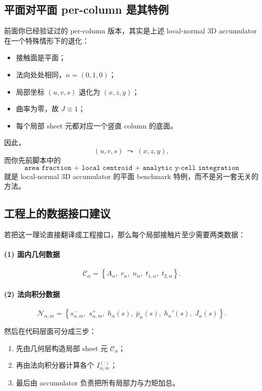 \documentclass[12pt,a4paper]{ctexart}
\begin{document}
\subsection{平面对平面 per-column 是其特例}

前面你已经验证过的 per-column 版本，其实是上述 local-normal 3D accumulator 在一个特殊情形下的退化：
\begin{itemize}
    \item 接触面是平面；
    \item 法向处处相同，$n=(0,1,0)$；
    \item 局部坐标 $(u,v,s)$ 退化为 $(x,z,y)$；
    \item 曲率为零，故 $J\equiv 1$；
    \item 每个局部 sheet 元都对应一个竖直 column 的底面。
\end{itemize}
因此，
\begin{equation}
    (u,v,s)\;\leadsto\;(x,z,y),
\end{equation}
而你先前脚本中的
\[
\texttt{area fraction + local centroid + analytic y-cell integration}
\]
就是 local-normal 3D accumulator 的平面 benchmark 特例，而不是另一套无关的方法。

\subsection{工程上的数据接口建议}

若把这一理论直接翻译成工程接口，那么每个局部接触片至少需要两类数据：

\paragraph{(1) 面内几何数据}
\begin{equation}
    \mathcal C_\alpha=
    \left\{
    A_\alpha,\;
    r_\alpha,\;
    n_\alpha,\;
    t_{1,\alpha},\;
    t_{2,\alpha}
    \right\}.
\end{equation}

\paragraph{(2) 法向积分数据}
\begin{equation}
    \mathcal N_{\alpha,m}=
    \left\{
    s^-_{\alpha,m},\;
    s^+_{\alpha,m},\;
    h_\alpha(s),\;
    \bar p_\alpha(s),\;
    h_\alpha'(s),\;
    J_\alpha(s)
    \right\}.
\end{equation}

然后在代码层面可分成三步：
\begin{enumerate}
    \item 先由几何层构造局部 sheet 元 $\mathcal C_\alpha$；
    \item 再由法向积分器计算各个 $I_{\alpha,m}^{(\cdot)}$；
    \item 最后由 accumulator 负责把所有局部力与力矩加总。
\end{enumerate}
\end{document}
